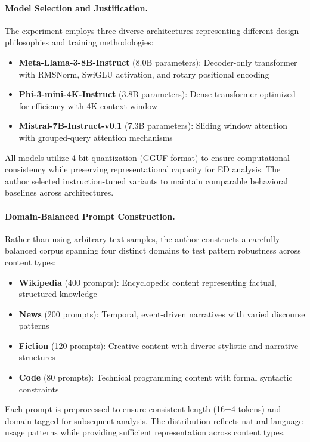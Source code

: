 \documentclass[12pt]{article}
\begin{document}
\paragraph{Model Selection and Justification.}
The experiment employs three diverse architectures representing different design philosophies and training methodologies:

\begin{itemize}[noitemsep]
\item \textbf{Meta-Llama-3-8B-Instruct} (8.0B parameters): Decoder-only transformer with RMSNorm, SwiGLU activation, and rotary positional encoding
\item \textbf{Phi-3-mini-4K-Instruct} (3.8B parameters): Dense transformer optimized for efficiency with 4K context window  
\item \textbf{Mistral-7B-Instruct-v0.1} (7.3B parameters): Sliding window attention with grouped-query attention mechanisms
\end{itemize}

All models utilize 4-bit quantization (GGUF format) to ensure computational consistency while preserving representational capacity for ED analysis. The author selected instruction-tuned variants to maintain comparable behavioral baselines across architectures.

\paragraph{Domain-Balanced Prompt Construction.}
Rather than using arbitrary text samples, the author constructs a carefully balanced corpus spanning four distinct domains to test pattern robustness across content types:

\begin{itemize}[noitemsep]
\item \textbf{Wikipedia} (400 prompts): Encyclopedic content representing factual, structured knowledge
\item \textbf{News} (200 prompts): Temporal, event-driven narratives with varied discourse patterns  
\item \textbf{Fiction} (120 prompts): Creative content with diverse stylistic and narrative structures
\item \textbf{Code} (80 prompts): Technical programming content with formal syntactic constraints
\end{itemize}

Each prompt is preprocessed to ensure consistent length (16±4 tokens) and domain-tagged for subsequent analysis. The distribution reflects natural language usage patterns while providing sufficient representation across content types.
\end{document}
